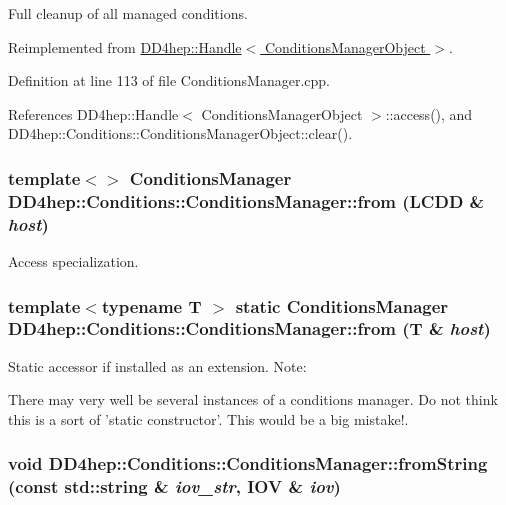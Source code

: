 Full cleanup of all managed conditions. 

Reimplemented from \hyperlink{class_d_d4hep_1_1_handle_ad50d0ea67a1c9a4e87d232f96ebe52f1}{DD4hep::Handle$<$ ConditionsManagerObject $>$}.

Definition at line 113 of file ConditionsManager.cpp.

References DD4hep::Handle$<$ ConditionsManagerObject $>$::access(), and DD4hep::Conditions::ConditionsManagerObject::clear().\hypertarget{class_d_d4hep_1_1_conditions_1_1_conditions_manager_aa6ab9b41e81f93dea9ce024ace8b91b8}{
\subsubsection[{from}]{\setlength{\rightskip}{0pt plus 5cm}template$<$$>$ {\bf ConditionsManager} DD4hep::Conditions::ConditionsManager::from (LCDD \& {\em host})}}
\label{class_d_d4hep_1_1_conditions_1_1_conditions_manager_aa6ab9b41e81f93dea9ce024ace8b91b8}


Access specialization. \hypertarget{class_d_d4hep_1_1_conditions_1_1_conditions_manager_a6b5f292957b59a38ec35d29c02dd657e}{
\subsubsection[{from}]{\setlength{\rightskip}{0pt plus 5cm}template$<$typename T $>$ static {\bf ConditionsManager} DD4hep::Conditions::ConditionsManager::from ({\bf T} \& {\em host})}}
\label{class_d_d4hep_1_1_conditions_1_1_conditions_manager_a6b5f292957b59a38ec35d29c02dd657e}


Static accessor if installed as an extension. Note:

There may very well be several instances of a conditions manager. Do not think this is a sort of 'static constructor'. This would be a big mistake!. \hypertarget{class_d_d4hep_1_1_conditions_1_1_conditions_manager_aeb9918f7ba860061d6839628ae829447}{
\subsubsection[{fromString}]{\setlength{\rightskip}{0pt plus 5cm}void DD4hep::Conditions::ConditionsManager::fromString (const std::string \& {\em iov\_\-str}, \/  {\bf IOV} \& {\em iov})}}
\label{class_d_d4hep_1_1_conditions_1_1_conditions_manager_aeb9918f7ba860061d6839628ae829447}


